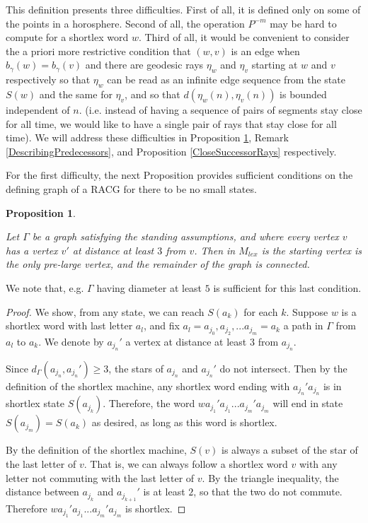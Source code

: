 \documentclass[10pt,a4paper]{amsart}
\newtheorem{proposition}[theorem]{Proposition}
\theoremstyle{definition}
\theoremstyle{remark}
\begin{document}
	This definition presents three difficulties. First of all, it is defined only on some of the points in a horosphere. Second of all, the operation $P^{-m}$ may be hard to compute for a shortlex word $w$. Third of all, it would be convenient to consider the a priori more restrictive condition that $(w,v)$ is an edge when $b_\gamma(w)=b_\gamma(v)$ and there are geodesic rays $\eta_w$ and $\eta_v$ starting at $w$ and $v$ respectively so that $\eta_w$ can be read as an infinite edge sequence from the state $S(w)$ and the same for $\eta_v$, and so that $d(\eta_w(n),\eta_v(n))$ is bounded independent of $n$. (i.e. instead of having a sequence of pairs of segments stay close for all time, we would like to have a single pair of rays that stay close for all time). We will address these difficulties in Proposition \ref{EveryStateLarge}, Remark \ref{DescribingPredecessors}, and Proposition \ref{CloseSuccessorRays} respectively.
	
	For the first difficulty, the next Proposition provides sufficient conditions on the defining graph of a RACG for there to be no small states.
	
	\begin{proposition} \label{EveryStateLarge}
		
		Let $\Gamma$ be a graph satisfying the standing assumptions, and where every vertex $v$ has a vertex $v'$ at distance at least $3$ from $v$. Then in $M_{lex}$ is the starting vertex is the only pre-large vertex, and the remainder of the graph is connected.
		
	\end{proposition}
	
	We note that, e.g. $\Gamma$ having diameter at least $5$ is sufficient for this last condition. 
	
	\begin{proof}
		
		We show, from any state, we can reach $S(a_k)$ for each $k$. Suppose $w$ is a shortlex word with last letter $a_l$, and fix $a_l=a_{j_0}, a_{j_2}, ...a_{j_m}=a_k$ a path in $\Gamma$ from $a_l$ to $a_k$. We denote by $a_{j_n}'$ a vertex at distance at least $3$ from $a_{j_n}$.
		
		Since $d_\Gamma(a_{j_n}, a_{j_n}')\ge 3$, the stars of $a_{j_n}$ and $a_{j_n}'$ do not intersect. Then by the definition of the shortlex machine, any shortlex word ending with $a_{j_n}'a_{j_n}$ is in shortlex state $S(a_{j_k})$. Therefore, the word $wa_{j_1}'a_{j_1}...a_{j_m}'a_{j_m}$ will end in state $S(a_{j_m})=S(a_k)$ as desired, as long as this word is shortlex.
		
		By the definition of the shortlex machine, $S(v)$ is always a subset of the star of the last letter of $v$. That is, we can always follow a shortlex word $v$ with any letter not commuting with the last letter of $v$. By the triangle inequality, the distance between $a_{j_k}$ and $a_{j_{k+1}}'$ is at least $2$, so that the two do not commute. Therefore $wa_{j_1}'a_{j_1}...a_{j_m}'a_{j_m}$ is shortlex.
		\end{proof}
	
\end{document}
